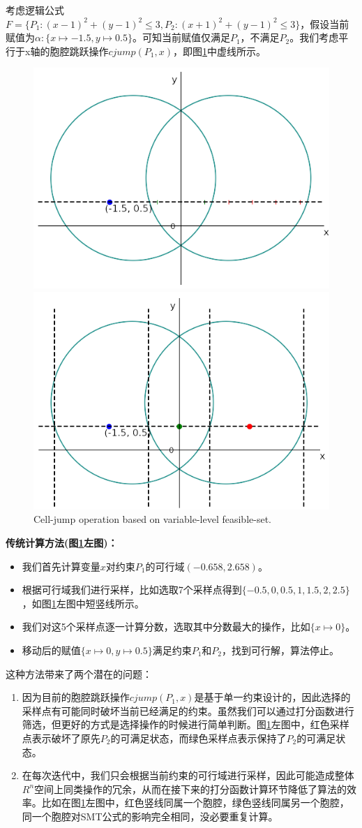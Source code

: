 \begin{example}
\label{ex:jump}
考虑逻辑公式$F = \{P_1: (x-1)^2 + (y-1)^2 \leq 3, P_2: (x+1)^2 + (y-1)^2 \leq 3\}$，假设当前赋值为$\alpha: \{x \mapsto -1.5, y \mapsto 0.5\}$。可知当前赋值仅满足$P_1$，不满足$P_2$。我们考虑平行于x轴的胞腔跳跃操作$cjump(P_1, x)$，即图\ref{fig:jump2}中虚线所示。

\begin{figure}[t]
    \centering
    \includegraphics[width=0.45\columnwidth]{Img/op1.png}\qquad
    \includegraphics[width=0.45\columnwidth]{Img/op2.png}
     {Cell-jump operation based on variable-level feasible-set.}
\label{fig:jump2}
\end{figure}

\textbf{传统计算方法(图\ref{fig:jump2}左图)：}
\begin{itemize}
    \item 我们首先计算变量$x$对约束$P_1$的可行域$(-0.658, 2.658)$。
    \item 根据可行域我们进行采样，比如选取7个采样点得到$\{-0.5, 0, 0.5, 1, 1.5, 2, 2.5\}$，如图\ref{fig:jump2}左图中短竖线所示。
    \item 我们对这5个采样点逐一计算分数，选取其中分数最大的操作，比如$\{x \mapsto 0\}$。
    \item 移动后的赋值$\{x \mapsto 0, y \mapsto 0.5\}$满足约束$P_1$和$P_2$，找到可行解，算法停止。
\end{itemize}

这种方法带来了两个潜在的问题：
\begin{enumerate}
    \item 因为目前的胞腔跳跃操作$cjump(P_1, x)$是基于单一约束设计的，因此选择的采样点有可能同时破坏当前已经满足的约束。虽然我们可以通过打分函数进行筛选，但更好的方式是选择操作的时候进行简单判断。图\ref{fig:jump2}左图中，红色采样点表示破坏了原先$P_2$的可满足状态，而绿色采样点表示保持了$P_2$的可满足状态。
    \item 在每次迭代中，我们只会根据当前约束的可行域进行采样，因此可能造成整体$R^n$空间上同类操作的冗余，从而在接下来的打分函数计算环节降低了算法的效率。比如在图\ref{fig:jump2}左图中，红色竖线同属一个胞腔，绿色竖线同属另一个胞腔，同一个胞腔对SMT公式的影响完全相同，没必要重复计算。
\end{enumerate}


\end{example}
